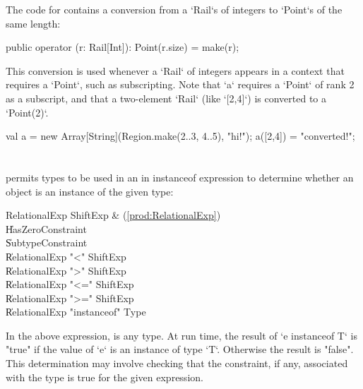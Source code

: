 \begin{ex}
The code for  contains a conversion from a
\xcd`Rail`s of integers to \xcd`Point`s of the same length: 
\begin{xten}
  public operator (r: Rail[Int]): Point(r.size) 
         = make(r);
\end{xten}
This conversion is used whenever a \xcd`Rail` of integers appears in a 
context that requires a \xcd`Point`, such as subscripting. Note 
that \xcd`a` requires a \xcd`Point` of rank 2 as a subscript, and that 
a two-element \xcd`Rail` (like \xcd`[2,4]`) is converted to a 
\xcd`Point(2)`.
% 
\begin{xten}
val a = new Array[String](Region.make(2..3, 4..5), "hi!");
a([2,4]) = "converted!";
\end{xten}


\end{ex}



\section{}
\label{instanceOf}

\Xten{} permits types to be used in an in instanceof expression
to determine whether an object is an instance of the given type:

\begin{bbgrammar}
       RelationalExp \: ShiftExp & (\ref{prod:RelationalExp}) \\
                     \| HasZeroConstraint \\
                     \| SubtypeConstraint \\
                     \| RelationalExp \xcd"<" ShiftExp \\
                     \| RelationalExp \xcd">" ShiftExp \\
                     \| RelationalExp \xcd"<=" ShiftExp \\
                     \| RelationalExp \xcd">=" ShiftExp \\
                     \| RelationalExp \xcd"instanceof" Type \\
\end{bbgrammar}

In the above expression,  is any type. At run time, the
result of \xcd`e instanceof T`
is \xcd"true" if the
value of \xcd`e` is an instance of type \xcd`T`.
Otherwise the result is \xcd"false". This determination may involve checking
that the constraint, if any, associated with the type is true for the given
expression.

